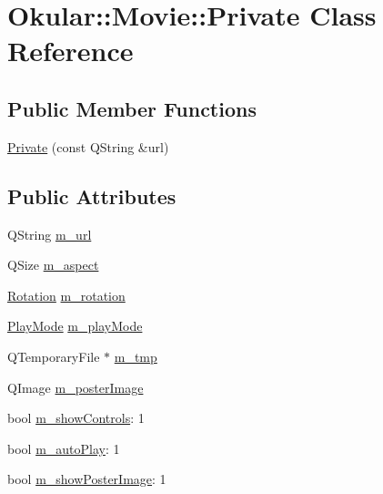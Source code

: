 \hypertarget{classMovie_1_1Private}{\section{Okular\+:\+:Movie\+:\+:Private Class Reference}
\label{classMovie_1_1Private}
}
\subsection*{Public Member Functions}
\begin{DoxyCompactItemize}
\item 
\hyperlink{classMovie_1_1Private_a729b31cad6ee31af411896dc57deeeb7}{Private} (const Q\+String \&url)
\end{DoxyCompactItemize}
\subsection*{Public Attributes}
\begin{DoxyCompactItemize}
\item 
Q\+String \hyperlink{classMovie_1_1Private_a4854a7b3f3c477551174018976eb794f}{m\+\_\+url}
\item 
Q\+Size \hyperlink{classMovie_1_1Private_a3af3868607b59bacaa1ec3d999e44a71}{m\+\_\+aspect}
\item 
\hyperlink{namespaceOkular_a8556d00465f61ef533c6b027669e7da6}{Rotation} \hyperlink{classMovie_1_1Private_ac853dc27239be18e7e6fc0ce975168dc}{m\+\_\+rotation}
\item 
\hyperlink{classOkular_1_1Movie_ac15c187b1f32107f51813a0da17e099b}{Play\+Mode} \hyperlink{classMovie_1_1Private_ab418a34a68536a04613e37bf8711f783}{m\+\_\+play\+Mode}
\item 
Q\+Temporary\+File $\ast$ \hyperlink{classMovie_1_1Private_a7cb9fd2bb37d4e64e46512cda29fbf73}{m\+\_\+tmp}
\item 
Q\+Image \hyperlink{classMovie_1_1Private_a010b7491e1f102a2db84e1b575b7de58}{m\+\_\+poster\+Image}
\item 
bool \hyperlink{classMovie_1_1Private_ad5410d6b4a6ad3b9c894cfc1dce9b1d0}{m\+\_\+show\+Controls}\+: 1
\item 
bool \hyperlink{classMovie_1_1Private_a2877e4e03e5b0bb2af911834dc4363db}{m\+\_\+auto\+Play}\+: 1
\item 
bool \hyperlink{classMovie_1_1Private_a914c169b8e31855cc2cf444a5475d384}{m\+\_\+show\+Poster\+Image}\+: 1
\end{DoxyCompactItemize}


